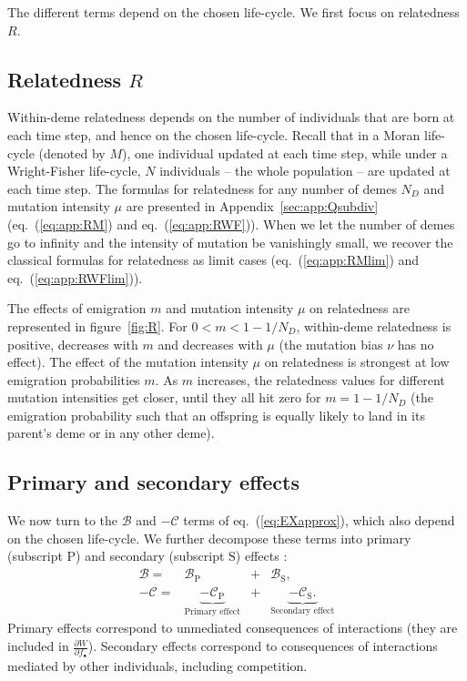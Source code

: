 \documentclass[11pt, letterpaper]{article}
\renewcommand{\eqref}[1]{\textup{{\normalfont eq.~(\ref{#1}}\normalfont)}}
\newcommand{\derivn}[2]{\frac{\partial #1}{\partial #2}}
\newcommand{\appname}[0]{Appendix}
\newcommand{\focal}{\bullet}
\newcommand{\prim}{\textrm{P}}
\newcommand{\secd}{\textrm{S}}
\newcommand{\ndemes}{N_D}
\begin{document}
The different terms depend on the chosen life-cycle. We first focus on relatedness $R$.


\subsection*{Relatedness $R$}

Within-deme relatedness depends on the number of individuals that are born at each time step, and hence on the chosen life-cycle. Recall that in a Moran life-cycle (denoted by $M$), one individual updated at each time step, while under a Wright-Fisher life-cycle, $N$ individuals -- the whole population -- are updated at each time step. The formulas for relatedness for any number of demes $\ndemes$ and mutation intensity $\mu$ are presented in \appname~\ref{sec:app:Qsubdiv} (\eqref{eq:app:RM} and \eqref{eq:app:RWF}). When we let the number of demes go to infinity and the intensity of mutation be vanishingly small, we recover the classical formulas for relatedness as limit cases (\eqref{eq:app:RMlim} and \eqref{eq:app:RWFlim}). 

The effects of emigration $m$ and mutation intensity $\mu$ on relatedness are represented in figure~\ref{fig:R}. For $0<m<1-1/\ndemes$, within-deme relatedness is positive, decreases with $m$ and decreases with $\mu$ (the mutation bias $\nu$ has no effect). The effect of the mutation intensity $\mu$ on relatedness is strongest at low emigration probabilities $m$. As $m$ increases, the relatedness values for different mutation intensities get closer, until they all hit zero for $m=1-1/\ndemes$ (the emigration probability such that an offspring is equally likely to land in its parent's deme or in any other deme). 



    
 

\subsection*{Primary and secondary effects}


We now turn to the $\mathcal{B}$ and $-\mathcal{C}$ terms of \eqref{eq:EXapprox}, which also depend on the chosen life-cycle. We further decompose these terms into primary (subscript $\prim$) and secondary (subscript $\secd$) effects \citep{WestGardner2010}: 
\begin{equation}
\begin{array}{rccc}
\mathcal{B} =&  \mathcal{B}_{\prim} &+& \mathcal{B}_{\secd},\\
-\mathcal{C} =& \underbrace{-\mathcal{C}_{\prim}}_{\textrm{Primary effect}} &+& \underbrace{-\mathcal{C}_{\secd}.}_{\textrm{Secondary effect}}
%
\end{array}
\end{equation} 
%
Primary effects correspond to unmediated consequences of interactions (they are included in $\derivn{W}{f_{\focal}}$). Secondary effects correspond to consequences of interactions mediated by other individuals, including competition. 
\end{document}
